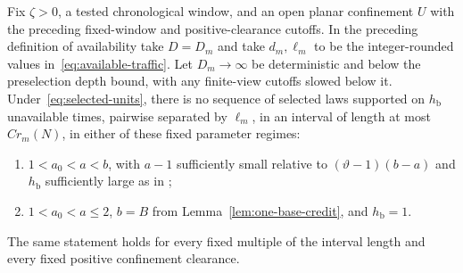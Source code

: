 \begin{proposition}
\label{prop:flow-availability}
Fix \(\zeta>0\), a tested chronological window, and an open planar
confinement \(U\) with the preceding fixed-window and positive-clearance
cutoffs.  In the preceding definition of availability take \(D=D_m\)
and take \(d_m,\ell_m\) to be the integer-rounded values
in~\eqref{eq:available-traffic}.  Let \(D_m\to\infty\) be deterministic
and below the preselection
depth bound, with any finite-view cutoffs slowed below it.
Under~\eqref{eq:selected-units}, there is no sequence of selected
laws supported on \(h_{\mathrm b}\) unavailable times, pairwise
separated by \(\ell_m\), in an interval of length at most
\(C r_m(N)\), in either of these fixed parameter regimes:
\begin{enumerate}[label=(\roman*)]
\item \(1<a_0<a<b\), with \(a-1\) sufficiently small relative
to \((\vartheta-1)(b-a)\) and \(h_{\mathrm b}\) sufficiently
large as in \cite[Proposition~10.18]{P};
\item \(1<a_0<a\le2\), \(b=B\) from
Lemma~\ref{lem:one-base-credit}, and \(h_{\mathrm b}=1\).
\end{enumerate}
The same statement holds for every fixed multiple of the interval
length and every fixed positive confinement clearance.
\end{proposition}

